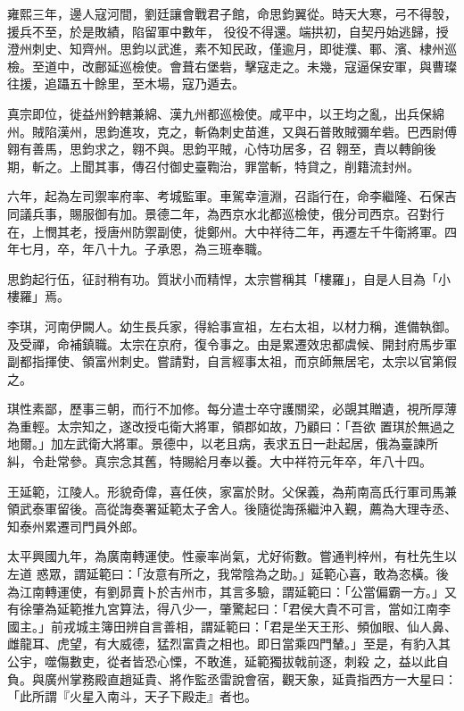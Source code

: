 \begin{pinyinscope}
 雍熙三年，邊人寇河間，劉廷讓會戰君子館，命思鈞翼從。時天大寒，弓不得彀，援兵不至，於是敗績，陷留軍中數年，
 役役不得還。端拱初，自契丹始逃歸，授澄州刺史、知齊州。思鈞以武進，素不知民政，僅逾月，即徙濮、鄆、濱、棣州巡檢。至道中，改鄜延巡檢使。會葺右堡砦，擊寇走之。未幾，寇逼保安軍，與曹璨往援，追躡五十餘里，至木場，寇乃遁去。



 真宗即位，徙益州鈐轄兼綿、漢九州都巡檢使。咸平中，以王均之亂，出兵保綿州。賊陷漢州，思鈞進攻，克之，斬偽刺史苗進，又與石普敗賊彌牟砦。巴西尉傅翱有善馬，思鈞求之，翱不與。思鈞平賊，心恃功居多，召
 翱至，責以轉餉後期，斬之。上聞其事，傳召付御史臺鞫治，罪當斬，特貸之，削籍流封州。



 六年，起為左司禦率府率、考城監軍。車駕幸澶淵，召詣行在，命李繼隆、石保吉同議兵事，賜服御有加。景德二年，為西京水北都巡檢使，俄分司西京。召對行在，上憫其老，授唐州防禦副使，徙鄭州。大中祥待二年，再遷左千牛衛將軍。四年七月，卒，年八十九。子承恩，為三班奉職。



 思鈞起行伍，征討稍有功。質狀小而精悍，太宗嘗稱其「樓羅」，自是人目為「小
 樓羅」焉。



 李琪，河南伊闕人。幼生長兵家，得給事宣祖，左右太祖，以材力稱，進備執御。及受禪，命補鎮職。太宗在京府，復令事之。由是累遷效忠都虞候、開封府馬步軍副都指揮使、領富州刺史。嘗請對，自言經事太祖，而京師無居宅，太宗以官第假之。



 琪性素鄙，歷事三朝，而行不加修。每分遣士卒守護關梁，必覬其贈遺，視所厚薄為重輕。太宗知之，遂改授屯衛大將軍，領郡如故，乃顧曰：「吾欲
 置琪於無過之地爾。」加左武衛大將軍。景德中，以老且病，表求五日一赴起居，俄為臺諫所糾，令赴常參。真宗念其舊，特賜給月奉以養。大中祥符元年卒，年八十四。



 王延範，江陵人。形貌奇偉，喜任俠，家富於財。父保義，為荊南高氏行軍司馬兼領武泰軍留後。高從誨奏署延範太子舍人。後隨從誨孫繼沖入覲，薦為大理寺丞、知泰州累遷司門員外郎。



 太平興國九年，為廣南轉運使。性豪率尚氣，尤好術數。嘗通判梓州，有杜先生以左道
 惑眾，謂延範曰：「汝意有所之，我常陰為之助。」延範心喜，敢為恣橫。後為江南轉運使，有劉昴賣卜於吉州市，其言多驗，謂延範曰：「公當偏霸一方。」又有徐肇為延範推九宮算法，得八少一，肇驚起曰：「君侯大貴不可言，當如江南李國主。」前戎城主簿田辨自言善相，謂延範曰：「君是坐天王形、頻伽眼、仙人鼻、雌龍耳、虎望，有大威德，猛烈富貴之相也。即日當乘四門輦。」至是，有豹入其公宇，噬傷數吏，從者皆恐心慄，不敢進，延範獨拔戟前逐，刺殺
 之，益以此自負。與廣州掌務殿直趙延貴、將作監丞雷說會宿，觀天象，延貴指西方一大星曰：「此所謂『火星入南斗，天子下殿走』者也。




\end{pinyinscope}
